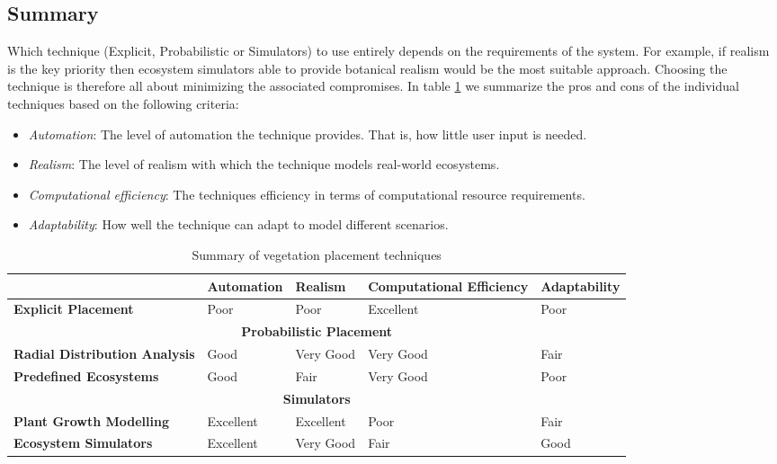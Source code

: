 \subsection{Summary} \label{subsec:vegetation_summary}

Which technique (Explicit, Probabilistic or Simulators) to use entirely depends on the requirements of the system. For example, if realism is the key priority then ecosystem simulators able to provide botanical realism would be the most suitable approach. Choosing the technique is therefore all about minimizing the associated compromises. In table \ref{tab:pros_and_cons_of_vegetation_placement_techniques} we summarize the pros and cons of the individual techniques based on the following criteria: 
\begin{itemize}
\item \textit{Automation}: The level of automation the technique provides. That is, how little user input is needed.
\item \textit{Realism}: The level of realism with which the technique models real-world ecosystems.
\item \textit{Computational efficiency}: The techniques efficiency in terms of computational resource requirements.
\item \textit{Adaptability}: How well the technique can adapt to model different scenarios.
\end{itemize}
\begin{table}[h]
  \centering
	    \begin{tabular}{|p{4cm}|p{3cm}|p{3cm}|p{3cm}|p{3cm}|}
  	    \hline	
  	      & \textbf{Automation} & \textbf{Realism} & \textbf{Computational Efficiency} & \textbf{Adaptability} \\
		\hline	
		\textbf{Explicit Placement} & 
		 Poor  & Poor  & Excellent & Poor      \\
  	    \hline	
  	    \multicolumn{5}{|c|}{\textbf{Probabilistic Placement}} \\
  	    \hline				
  	    \textbf{Radial Distribution Analysis} & 
		 Good & Very Good & Very Good & Fair   \\
  	    \hline
		\textbf{Predefined Ecosystems} & 
		 Good & Fair & Very Good & Poor      \\
  	    \hline
		\multicolumn{5}{|c|}{\textbf{Simulators}} \\
  	    \hline		
		\textbf{Plant Growth Modelling} & 
		 Excellent & Excellent & Poor & Fair  \\
  	    \hline
		\textbf{Ecosystem Simulators} & 
		 Excellent & Very Good & Fair & Good   \\
  	    \hline
  	    \end{tabular}
  \caption[Summary of vegetation placement techniques]{Summary of vegetation placement techniques}
  \label{tab:pros_and_cons_of_vegetation_placement_techniques}
\end{table}

